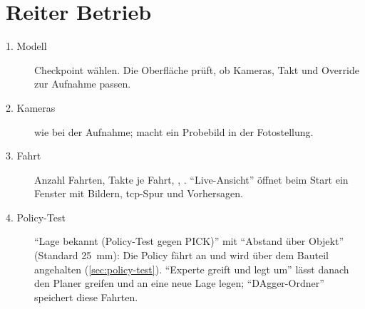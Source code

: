 \section{Reiter Betrieb}

\begin{description}
  \item[1. Modell] Checkpoint wählen. Die Oberfläche prüft, ob Kameras, Takt und Override zur
    Aufnahme passen.
  \item[2. Kameras] wie bei der Aufnahme;  macht ein Probebild in der
    Fotostellung.
  \item[3. Fahrt] Anzahl Fahrten, Takte je Fahrt, , .
    \enquote{Live-Ansicht} öffnet beim Start ein Fenster mit Bildern, \acs{tcp}-Spur und
    Vorhersagen.
  \item[4. Policy-Test] \enquote{Lage bekannt (Policy-Test gegen PICK)} mit
    \enquote{Abstand über Objekt} (Standard \SI{25}{\milli\metre}): Die Policy fährt an und wird
    über dem Bauteil angehalten (\cref{sec:policy-test}). \enquote{Experte greift und legt um}
    lässt danach den Planer greifen und an eine neue Lage legen; \enquote{DAgger-Ordner}
    speichert diese Fahrten.
\end{description}
